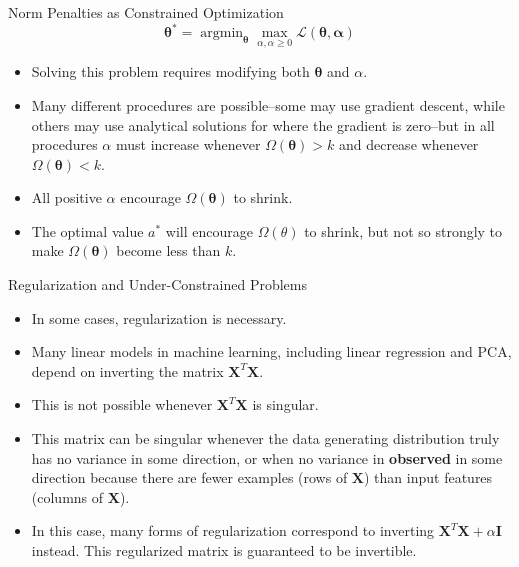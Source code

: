 \documentclass[10pt]{beamer}
\begin{document}
	\begin{frame}{Norm Penalties as Constrained Optimization}
		$$\bm{\theta}^*=\mathop{\arg\min}_{\bm{\theta}}\mathop{\max}_{\alpha,\alpha\geq0}\mathcal{L}(\bm{\theta,\alpha}) $$
		
		\begin{itemize}
			\item Solving this problem requires modifying both $\bm{\theta}$ and $\alpha$.
			\pause
			\item Many different procedures are possible--some may use gradient descent, while others may use analytical solutions for where the gradient is zero--but in all procedures $\alpha$ must increase whenever $\Omega(\bm{\theta})>k$ and decrease whenever $\Omega(\bm{\theta})<k$.
			\pause
			\item All positive $\alpha$ encourage $\Omega(\bm{\theta})$ to shrink.
			\pause
			\item The optimal value $a^*$ will encourage $\Omega(\theta)$ to shrink, but not so strongly to make $\Omega(\bm{\theta})$ become less than $k$.
		\end{itemize}
	\end{frame}

	\begin{frame}{Regularization and Under-Constrained Problems}
		\begin{itemize}
			\item In some cases, regularization is necessary.
			\pause
			\item Many linear models in machine learning, including linear regression and PCA, depend on inverting the matrix $\bm{X}^T\bm{X}$.
			\pause
			\item This is not possible whenever $\bm{X}^T\bm{X}$ is singular.
			\pause
			\item This matrix can be singular whenever the data generating distribution truly has no variance in some direction, or when no variance in \textbf{observed} in some direction because there are fewer examples (rows of $\bm{X}$) than input features (columns of $\bm{X}$).
			\pause
			\item In this case, many forms of regularization correspond to inverting $\bm{X}^T\bm{X}+\alpha\bm{I}$ instead. This regularized matrix is guaranteed to be invertible.
		\end{itemize}
	\end{frame}
\end{document}
